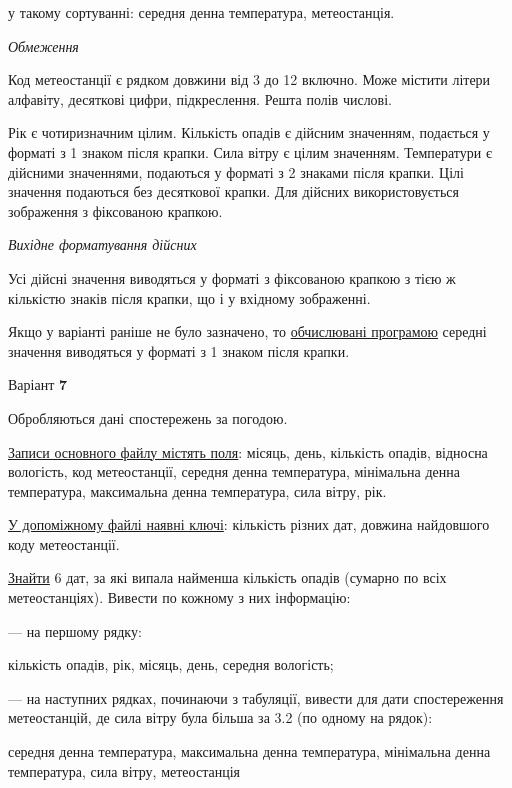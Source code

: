 \documentclass[11pt, ukrainian]{article}
\begin{document}
{\noindent}у такому сортуванні: середня денна температура, метеостанція.


\bigskip\textit{Обмеження}

Код метеостанції є рядком довжини від 3 до 12 включно.
Може містити літери алфавіту, десяткові цифри, підкреслення. Решта полів числові.

Рік є чотиризначним цілим.
Кількість опадів є дійсним значенням, подається у форматі з 1 знаком після крапки.
Сила вітру є цілим значенням.
Температури є дійсними значеннями, подаються у форматі з 2 знаками після крапки.
Цілі значення подаються без десяткової крапки.
Для дійсних використовується зображення з фіксованою крапкою.

\textit{Вихідне форматування дійсних}

Усі дійсні значення виводяться у форматі з фіксованою крапкою з тією ж кількістю знаків після крапки, що і у вхідному зображенні.

Якщо у варіанті раніше не було зазначено, то \underline{обчислювані програмою} середні значення виводяться у форматі з 1 знаком після крапки.


\par
\newpage
{\center Варіант  \No \textbf { 7 }\par}
\bigskip
Обробляються дані спостережень за погодою. 

\underline{Записи основного файлу містять поля}: місяць, день, кількість опадів, відносна вологість, код метеостанції, середня денна температура, мінімальна денна температура, максимальна денна температура, сила вітру, рік.

\underline{У допоміжному файлі наявні ключі}: кількість різних дат, довжина найдовшого коду метеостанції.

\underline{Знайти} 6 дат, за які випала найменша кількість опадів (сумарно по всіх метеостанціях). Вивести по кожному з них інформацію:\par
{\noindent}--- на першому рядку:\par
кількість опадів, рік, місяць, день, середня вологість;

{\noindent}--- на наступних рядках, починаючи з табуляції, вивести для дати спостереження метеостанцій, де сила вітру була більша за 3.2 (по одному на рядок):\par
середня денна температура, максимальна денна температура, мінімальна денна температура, сила вітру, метеостанція
\end{document}
